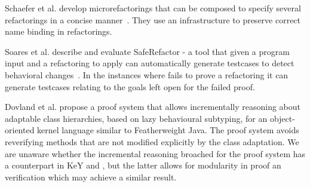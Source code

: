 Schaefer et al. develop microrefactorings that can be composed to specify several refactorings in a concise manner~\cite{Schafer-OOPSLA-2010}.
They use an infrastructure to preserve correct name binding in refactorings.

Soares et al. describe and evaluate SafeRefactor - a tool that given a program input and a refactoring to apply can automatically generate testcases to detect behavioral changes~\cite{Soares-IEEE-2010}.
In the instances where \Refinity{} fails to prove a refactoring it can generate testcases relating to the goals left open for the failed proof.


Dovland et al. \cite{dovland:adaptableclass2015} propose a proof system that allows
incrementally reasoning about adaptable class hierarchies, based on
lazy behavioural subtyping, for 
an object-oriented kernel language similar to Featherweight Java. The
proof system avoids reverifying methods that are not modified
explicitly by the class adaptation.
We are unaware whether the incremental reasoning broached for the proof system has a counterpart in KeY and \Refinity{}, but
the latter allows for modularity in proof an verification which may achieve a similar result.


